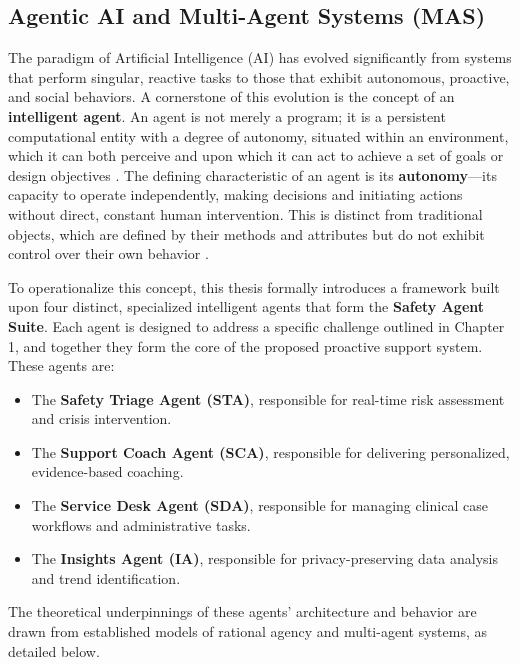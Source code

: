 \subsection{Agentic AI and Multi-Agent Systems (MAS)}
\label{subsec:agentic_ai}

The paradigm of Artificial Intelligence (AI) has evolved significantly from systems that perform singular, reactive tasks to those that exhibit autonomous, proactive, and social behaviors. A cornerstone of this evolution is the concept of an \textbf{intelligent agent}. An agent is not merely a program; it is a persistent computational entity with
a degree of autonomy, situated within an environment, which it can both perceive and upon which it can act to achieve a set of goals or design objectives \cite{wooldridge1995intelligentagents}. The defining characteristic of an agent is its \textbf{autonomy}—its capacity to operate independently, making decisions and initiating actions without direct, constant human intervention. This is distinct from traditional objects, which are defined by their methods and attributes but do not exhibit control over their own behavior \cite{wooldridge2009introductionmas}.

To operationalize this concept, this thesis formally introduces a framework built upon four distinct, specialized intelligent agents that form the \textbf{Safety Agent Suite}. Each agent is designed to address a specific challenge outlined in Chapter 1, and together they form the core of the proposed proactive support system. These agents are:
\begin{itemize}
    \item The \textbf{Safety Triage Agent (STA)}, responsible for real-time risk assessment and crisis intervention.
    \item The \textbf{Support Coach Agent (SCA)}, responsible for delivering personalized, evidence-based coaching.
    \item The \textbf{Service Desk Agent (SDA)}, responsible for managing clinical case workflows and administrative tasks.
    \item The \textbf{Insights Agent (IA)}, responsible for privacy-preserving data analysis and trend identification.
\end{itemize}

The theoretical underpinnings of these agents' architecture and behavior are drawn from established models of rational agency and multi-agent systems, as detailed below.

